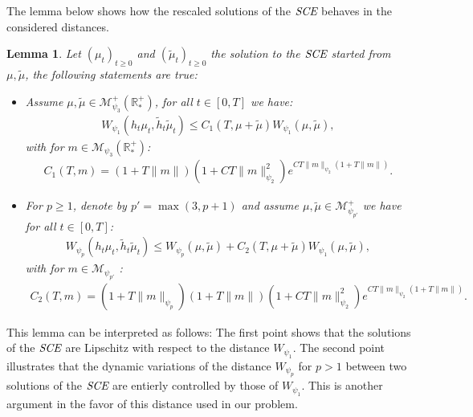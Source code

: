 \documentclass[11pt,a4paper]{article}
\newcommand{\RRP}{\mathbb{R}^+_*}
\newcommand{\MC}{\mathcal{M}}
\newcommand{\SCE}{\emph{SCE}}
\newcommand{\Proc}[1]{\left(#1\right)_{t\geq 0}}
\newtheorem{lemma}[theorem]{Lemma}
\begin{document}
The lemma below shows how the rescaled solutions of the $\SCE$ behaves in the considered distances.
\begin{lemma}\label{lem:wass-rescaled-SCE}
    Let $\Proc{\mu_t}$ and $\Proc{\tilde{\mu}_t}$ the solution to the $\SCE$ started from $\mu, \tilde{\mu}$, the following statements are true:
    \begin{itemize}
        \item Assume $\mu, \tilde{\mu} \in \MC^+_{\psi_3}(\RRP)$, for all $t \in [0,T]$ we have:
            \begin{align*}
                W_{\psi_1} \left(h_t\mu_t ,\tilde{h}_t\tilde{\mu}_t\right) \leq  C_1(T,\mu + \tilde{\mu})W_{\psi_1}(\mu,\tilde{\mu}),
            \end{align*}
            with for $m \in \MC_{\psi_3}(\RRP)$:
            \begin{align*}
                C_1(T,m) = \left( 1 + T\|m\|\right)\left(1 +  CT\|m\|_{\psi_2}^2\right) e^{CT\|m\|_{\psi_2}\left(1 + T\|m\|\right)}.
            \end{align*}
        \item For $p \geq 1$, denote by $p' = \max(3,p+1)$ and assume $\mu, \tilde{\mu} \in \MC^+_{\psi_{p'}}$ we have for all $t \in [0,T]$:
            \begin{align*}
                W_{\psi_p} \left(h_t\mu_t ,\tilde{h}_t\tilde{\mu}_t\right) \leq W_{\psi_p}(\mu,\tilde{\mu}) + C_2(T,\mu + \tilde{\mu})W_{\psi_1}(\mu,\tilde{\mu}),
            \end{align*}
            with for $m \in \MC_{\psi_{p'}}$ :
            \begin{align*}
                C_2(T,m) = ( 1  + T\|m\|_{\psi_{p}})\left( 1 + T\|m\|\right)\left(1 +  CT\|m\|_{\psi_2}^2\right) e^{CT\|m\|_{\psi_2}\left(1 + T\|m\|\right)}.
            \end{align*}
    \end{itemize}
\end{lemma}
This lemma can be interpreted as follows: The first point shows that the solutions of the $\SCE$ are Lipschitz with respect to the distance $W_{\psi_1}$. The second point illustrates that the dynamic variations of the distance $W_{\psi_p}$ for $p > 1$ between two solutions of the $\SCE$ are entierly controlled by those of $W_{\psi_1}$. This is another argument in the favor of this distance used in our problem.
\end{document}
